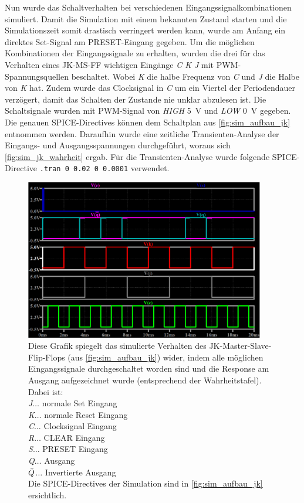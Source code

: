 \documentclass[12pt,english,ngerman]{scrartcl}
\begin{document}
Nun wurde das Schaltverhalten bei verschiedenen Eingangssignalkombinationen
simuliert. 
Damit die Simulation mit einem bekannten Zustand starten und die
Simulationszeit somit drastisch verringert werden kann, wurde am Anfang ein
direktes Set-Signal am PRESET-Eingang gegeben.
Um die möglichen Kombinationen der Eingangssignale zu erhalten, wurden
die drei für das Verhalten eines JK-MS-FF wichtigen Eingänge \textit{C K J}
mit PWM-Spannungsquellen beschaltet. Wobei \textit{K} die halbe Frequenz von \textit{C} und \textit{J} die
Halbe von \textit{K} hat. Zudem wurde das Clocksignal in \textit{C} um ein Viertel der
Periodendauer verzögert, damit das Schalten der Zustande nie unklar abzulesen
ist.
Die Schaltsignale wurden mit PWM-Signal von \textit{HIGH} \SI{5}{\volt} und
\textit{LOW} \SI{0}{\volt} gegeben. Die genauen SPICE-Directives können dem
Schaltplan aus \autoref{fig:sim_aufbau_jk} entnommen werden. Daraufhin wurde
eine zeitliche Transienten-Analyse der Eingangs- und Ausgangsspannungen
durchgeführt, woraus sich \autoref{fig:sim_jk_wahrheit} ergab. Für die
Transienten-Analyse wurde folgende SPICE-Directive \texttt{.tran 0 0.02 0 0.0001}
verwendet.
\begin{figure}[H]
  \centering
  \includegraphics[width=\linewidth, height=7cm]{./figures/sim/jk/WahrheitstabelleJK.png}
  \caption{Diese Grafik spiegelt das simulierte Verhalten des JK-Master-Slave-Flip-Flops (aus
    \autoref{fig:sim_aufbau_jk}) wider, indem alle möglichen Eingangssignale
    durchgeschaltet worden sind und die Response am Ausgang aufgezeichnet
    wurde (entsprechend der Wahrheitstafel). 
    Dabei ist:\\
    \textit{J}$\dots$ normale Set Eingang\\
    \textit{K}$\dots$ normale Reset Eingang\\
    \textit{C}$\dots$ Clocksignal Eingang\\
    \textit{R}$\dots$ CLEAR Eingang\\
    \textit{S}$\dots$ PRESET Eingang\\
    \textit{Q}$\dots$ Ausgang\\
    \textit{$\Bar{Q}$}$\dots$ Invertierte Ausgang\\
    Die SPICE-Directives der Simulation sind in \autoref{fig:sim_aufbau_jk}
    ersichtlich.}
  \label{fig:sim_jk_wahrheit}
\end{figure}
\end{document}
